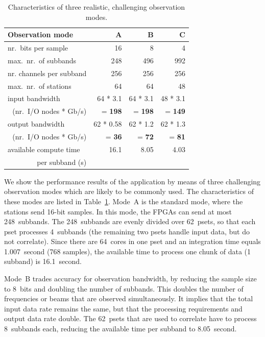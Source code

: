 \documentclass{sig-alternate}
\begin{document}
\begin{table}[ht]
\begin{center}
\begin{tabular}{|l|rrr|}
\hline
Observation mode	 & \textsf{A}	& \textsf{B}	& \textsf{C}	\\
\hline
nr.\ bits per sample	 & 16		& 8		& 4	\\
max.\ nr.\ of subbands	 & 248		& 496		& 992	\\
nr. channels per subband & 256		& 256		& 256	\\
max.\ nr.\ of stations	 & 64		& 64		& 48	\\
\hline
input bandwidth & 64 * 3.1  & 64 * 3.1 & 48 * 3.1 \\
\multicolumn{1}{|r|}{(nr.\ I/O nodes * Gb/s)} & = \textbf{198} & = \textbf{198} & = \textbf{149} \\
output bandwidth & 62 * 0.58 & 62 * 1.2 & 62 * 1.3 \\
\multicolumn{1}{|r|}{(nr.\ I/O nodes * Gb/s)}  & = \textbf{36} & = \textbf{72} & = \textbf{81} \\
\hline
available compute time	 & 16.1	     & 8.05     & 4.03     \\
\multicolumn{1}{|r|}{per subband (s)}	 & & & \\
\hline
\end{tabular}
\end{center}
\caption{Characteristics of three realistic, challenging observation modes.}
\label{tab:observation-characteristics}
\end{table}

We show the performance results of the application by means of three
challenging observation modes which are likely to be commonly used.
The characteristics of these modes are listed in
Table~\ref{tab:observation-characteristics}.
Mode~\textsf{A} is the standard mode, where the stations send 16-bit samples.
In this mode, the FPGAs can send at most 248~subbands.
The 248~subbands are evenly divided over 62~psets, so that each pset processes
4~subbands (the remaining two psets handle input data, but do not correlate).
Since there are 64~cores in one pset and an integration time equals
1.007~second (768 samples),
the available time to process one chunk of data (1 subband) is 16.1~second.

Mode~\textsf{B} trades accuracy for observation bandwidth, by reducing the
sample size to 8~bits and doubling the number of subbands.
This doubles the number of frequencies or beams that are observed
simultaneously.
It implies that the total input data rate remains the same, but that the
processing requirements and output data rate double.
The 62~psets that are used to correlate have to process 8~subbands each,
reducing the available time per subband to 8.05~second.
\end{document}
